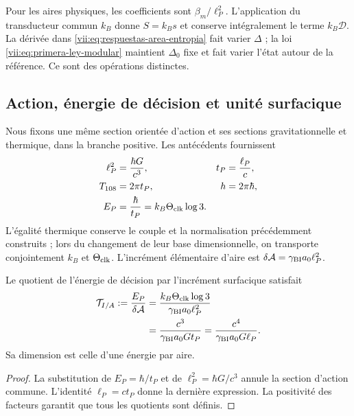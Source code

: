 Pour les aires physiques, les coefficients sont \(\beta_m/\ell_P^2\). L'application du transducteur commun \(k_B\) donne \(S=k_Bs\) et conserve intégralement le terme \(k_B\mathcal D\). La dérivée dans \eqref{vii:eq:respuestas-area-entropia} fait varier \(\Delta\) ; la loi \eqref{vii:eq:primera-ley-modular} maintient \(\Delta_0\) fixe et fait varier l'état autour de la référence. Ce sont des opérations distinctes.

\subsection{Action, énergie de décision et unité surfacique}
\label{vii:subsec:conversion-informacion-area}

Nous fixons une même section orientée d'action et ses sections gravitationnelle et thermique, dans la branche positive. Les antécédents fournissent
\begin{equation}
 \begin{aligned}
 \ell_P^2&=\frac{\hbar G}{c^3},& t_P&=\frac{\ell_P}{c},\\
 T_{108}&=2\pi t_P,& h&=2\pi\hbar,\\
 E_P&=\frac{\hbar}{t_P}=k_B\Theta_{\rm clk}\log3.&&
 \end{aligned}
 \label{vii:eq:unidad-accion-informacion}
\end{equation}
L'égalité thermique conserve le couple et la normalisation précédemment
construits ; lors du changement de leur base dimensionnelle, on transporte conjointement
\(k_B\) et \(\Theta_{\rm clk}\). L'incrément élémentaire d'aire est
\(\delta\mathcal A=\gamma_{\rm BI}a_0\ell_P^2\).

\begin{proposition}
\label{vii:prop:tension-informacion-area}
Le quotient de l'énergie de décision par l'incrément surfacique satisfait
\begin{equation}
 \begin{aligned}
 \mathcal T_{I/A}:=\frac{E_P}{\delta\mathcal A}
 &=\frac{k_B\Theta_{\rm clk}\log3}{\gamma_{\rm BI}a_0\ell_P^2}\\
 &=\frac{c^3}{\gamma_{\rm BI}a_0G t_P}
  =\frac{c^4}{\gamma_{\rm BI}a_0G\ell_P}.
 \end{aligned}
 \label{vii:eq:tension-informacion-area}
\end{equation}
Sa dimension est celle d'une énergie par aire.
\end{proposition}
\begin{proof}
La substitution de \(E_P=\hbar/t_P\) et de
\(\ell_P^2=\hbar G/c^3\) annule la section d'action commune.
L'identité \(\ell_P=ct_P\) donne la dernière expression. La positivité
des facteurs garantit que tous les quotients sont définis.
\end{proof}

